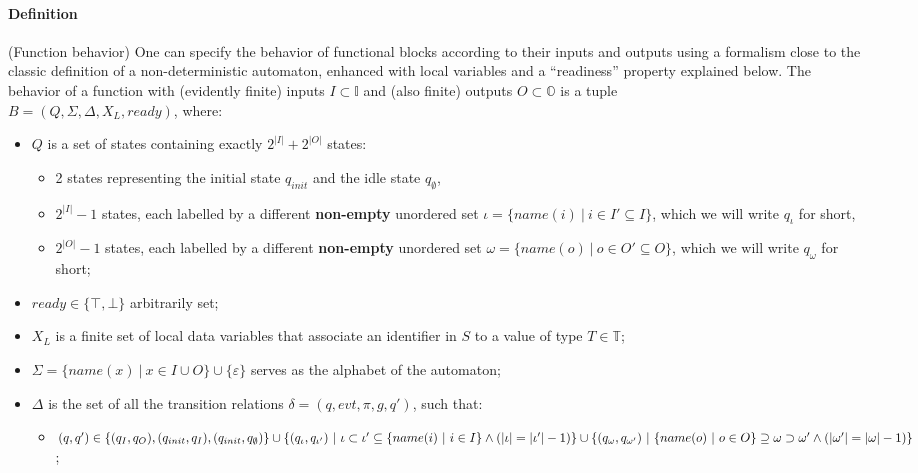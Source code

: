 \documentclass{article}
\begin{document}
\paragraph{Definition} (Function behavior) One can specify the behavior of functional blocks according to their inputs and outputs using a formalism close to the classic definition of a non-deterministic automaton, enhanced with local variables and a ``readiness'' property explained below. The behavior of a function with (evidently finite) inputs $I \subset \mathbb{I}$ and (also finite) outputs $O \subset \mathbb{O}$ is a tuple\\$B =  (Q,\Sigma,\Delta, X_L, ready)$, where:
\begin{itemize}
    \item $Q$ is a set of states containing exactly $2^{|I|} + 2^{|O|}$ states:
    \begin{itemize}
        \item 2 states representing the initial state $q_{init}$ and the idle state $q_{\emptyset}$,
        \item $2^{|I|}-1$ states, each labelled by a different \textbf{non-empty} unordered set $\iota=\{name(i)~|~i\in I'\subseteq I\}$, which we will write $q_\iota$ for short,
        \item $2^{|O|}-1$ states, each labelled by a different \textbf{non-empty} unordered set $\omega=\{name(o)~|~o\in O'\subseteq O\}$, which we will write $q_\omega$ for short;
    \end{itemize}
    \item $ready\in\{\top,\bot\}$ arbitrarily set;
    \item $X_L$ is a finite set of local data variables that associate an identifier in $S$ to a value of type $T\in\mathbb{T}$;
    \item $\Sigma = \{name(x)~|~x \in I \cup O\}\cup \{\varepsilon\}$ serves as the alphabet of the automaton;
    \item $\Delta$ is the set of all the transition relations $\delta = (q, evt, \pi, g, q')$, such that:
    \begin{itemize}
        \item $(q, q')\in \{(q_I,q_O), (q_{init},q_I), (q_{init},q_\emptyset)\}\\
        \cup \{(q_{\iota},q_{\iota'})~|~\iota\subset\iota'\subseteq \{name(i)~|~i\in I\} \wedge (|\iota| = |\iota'|-1)\}\\
        \cup \{(q_{\omega},q_{\omega'})~|~\{name(o)~|~o\in O\}\supseteq\omega\supset\omega'  \wedge (|\omega'| = |\omega|-1)\}$;

\end{itemize}
\end{itemize}
\end{document}
